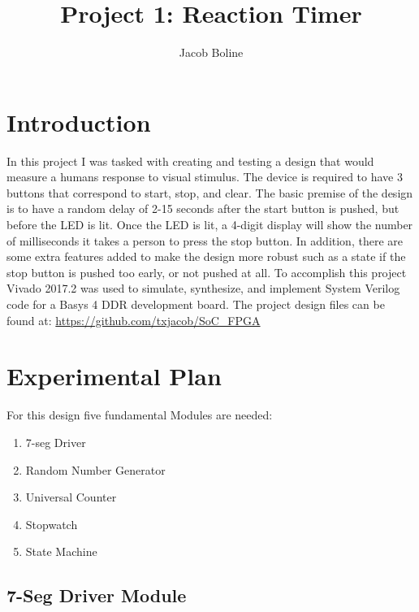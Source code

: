 \documentclass[11pt]{article}
\title{Project 1: Reaction Timer}
\author{Jacob Boline}
\begin{document}
\maketitle

\section{Introduction}
In this project I was tasked with creating and testing a design that would measure a humans response to visual stimulus. The device is required to have 3 buttons that correspond to start, stop, and clear. The basic premise of the design is to have a random delay of 2-15 seconds after the start button is pushed, but before the LED is lit. Once the LED is lit, a 4-digit display will show the number of milliseconds it takes a person to press the stop button. In addition, there are some extra features added to make the design more robust such as a state if the stop button is pushed too early, or not pushed at all. To accomplish this project Vivado 2017.2 was used to simulate, synthesize, and implement System Verilog code for a Basys 4 DDR development board. The project design files can be found at: \url{https://github.com/txjacob/SoC_FPGA}

\section{Experimental Plan}
For this design five fundamental Modules are needed:
\begin{enumerate}
    \item 7-seg Driver
    \item Random Number Generator
    \item Universal Counter
    \item Stopwatch
    \item State Machine
\end{enumerate}

\subsection{7-Seg Driver Module}
\end{document}
